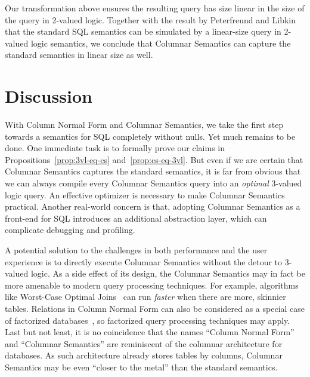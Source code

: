 \documentclass[sigconf]{acmart}
\begin{document}
Our transformation above ensures the resulting query 
 has size linear in the size of the query in 2-valued logic.
Together with the result by Peterfreund and Libkin~\cite{DBLP:conf/pods/LibkinP23}
 that the standard SQL semantics can be simulated by 
 a linear-size query in 2-valued logic semantics,
 we conclude that Columnar Semantics 
 can capture the standard semantics in linear size as well.


\section{Discussion}
\label{sec:conclusion}

With Column Normal Form and Columnar Semantics, 
 we take the first step towards a semantics for SQL
 completely without nulls.
Yet much remains to be done.
One immediate task is to formally prove our claims
 in Propositions~\ref{prop:3vl-eq-cs} and~\ref{prop:cs-eq-3vl}.
But even if we are certain that Columnar Semantics 
 captures the standard semantics,
 it is far from obvious that 
 we can always compile every Columnar Semantics query 
 into an {\em optimal} 3-valued logic query.
An effective optimizer is necessary to make 
 Columnar Semantics practical.
Another real-world concern is that,
 adopting Columnar Semantics 
 as a front-end for SQL introduces an additional abstraction layer,
 which can complicate debugging and profiling.

A potential solution to the challenges in 
 both performance and the user experience
 is to directly execute Columnar Semantics
 without the detour to 3-valued logic.
As a side effect of its design, the Columnar Semantics
 may in fact be more amenable to modern query processing techniques.
For example, algorithms like Worst-Case Optimal Joins~\cite{DBLP:journals/jacm/NgoPRR18}
 can run {\em faster} when there are more, skinnier tables. 
Relations in Column Normal Form can also be considered 
 as a special case of factorized databases~\cite{DBLP:journals/sigmod/OlteanuS16}, 
 so factorized query processing techniques may apply.
Last but not least, 
 it is no coincidence that the names ``Column Normal Form'' and ``Columnar Semantics''
 are reminiscent of the columnar architecture for databases.
As such architecture already stores tables by columns, 
 Columnar Semantics may be even ``closer to the metal'' 
 than the standard semantics.
\end{document}
